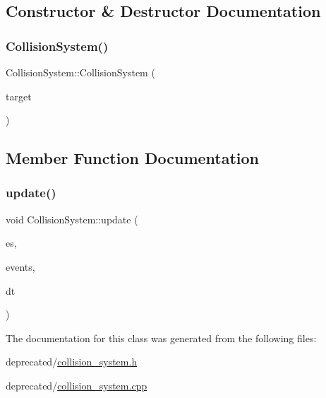 \subsection{Constructor \& Destructor Documentation}
\mbox{\label{classCollisionSystem_a3d6fbd73a8e9e123413d8907bc4a64a6}} 
\subsubsection{\texorpdfstring{Collision\+System()}{CollisionSystem()}}
{\footnotesize\ttfamily Collision\+System\+::\+Collision\+System (\begin{DoxyParamCaption}\item[{sf\+::\+Render\+Target \&}]{target }\end{DoxyParamCaption})\hspace{0.3cm}{\ttfamily [explicit]}}



\subsection{Member Function Documentation}
\mbox{\label{classCollisionSystem_a1206810c1190c25db4a27f70d0e8d27d}} 
\subsubsection{\texorpdfstring{update()}{update()}}
{\footnotesize\ttfamily void Collision\+System\+::update (\begin{DoxyParamCaption}\item[{entityx\+::\+Entity\+Manager \&}]{es,  }\item[{entityx\+::\+Event\+Manager \&}]{events,  }\item[{entityx\+::\+Time\+Delta}]{dt }\end{DoxyParamCaption})\hspace{0.3cm}{\ttfamily [override]}}



The documentation for this class was generated from the following files\+:\begin{DoxyCompactItemize}
\item 
deprecated/\hyperlink{collision__system_8h}{collision\+\_\+system.\+h}\item 
deprecated/\hyperlink{collision__system_8cpp}{collision\+\_\+system.\+cpp}\end{DoxyCompactItemize}
